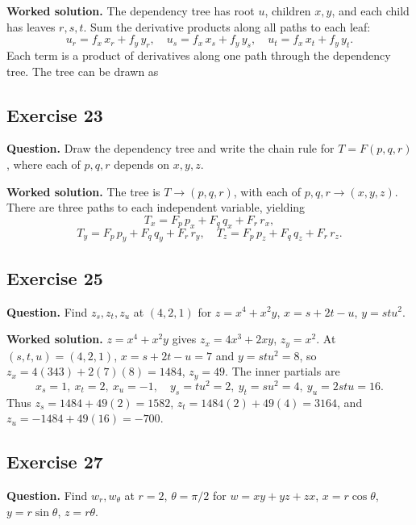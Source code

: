 \documentclass[11pt]{article}
\newcommand{\ex}[1]{\Needspace{8\baselineskip}\subsection*{Exercise #1}}
\newcommand{\ans}[1]{\boxed{#1}}
\begin{document}
\textbf{Worked solution.}
The dependency tree has root $u$, children $x,y$, and each child has leaves $r,s,t$. Sum the derivative products along all paths to each leaf:
\[\ans{u_r=f_x\,x_r+f_y\,y_r},\quad\ans{u_s=f_x\,x_s+f_y\,y_s},\quad\ans{u_t=f_x\,x_t+f_y\,y_t}.\]
Each term is a product of derivatives along one path through the dependency tree. The tree can be drawn as
\begin{center}\end{center}
\ex{23}
\textbf{Question.} Draw the dependency tree and write the chain rule for $T=F(p,q,r)$, where each of $p,q,r$ depends on $x,y,z$.

\textbf{Worked solution.}
The tree is $T\to(p,q,r)$, with each of $p,q,r\to(x,y,z)$. There are three paths to each independent variable, yielding
\[\ans{T_x=F_p\,p_x+F_q\,q_x+F_r\,r_x},\]
\[\ans{T_y=F_p\,p_y+F_q\,q_y+F_r\,r_y},\quad
\ans{T_z=F_p\,p_z+F_q\,q_z+F_r\,r_z}.\]
\begin{center}\end{center}
\ex{25}
\textbf{Question.} Find $z_s,z_t,z_u$ at $(4,2,1)$ for $z=x^4+x^2y$, $x=s+2t-u$, $y=stu^2$.

\textbf{Worked solution.}
$z=x^4+x^2y$ gives $z_x=4x^3+2xy$, $z_y=x^2$. At $(s,t,u)=(4,2,1)$, $x=s+2t-u=7$ and $y=stu^2=8$, so $z_x=4(343)+2(7)(8)=1484$, $z_y=49$. The inner partials are
\[x_s=1,\ x_t=2,\ x_u=-1,\quad y_s=tu^2=2,\ y_t=su^2=4,\ y_u=2stu=16.\]
Thus $\ans{z_s=1484+49(2)=1582}$, $\ans{z_t=1484(2)+49(4)=3164}$, and $\ans{z_u=-1484+49(16)=-700}$.
\ex{27}
\textbf{Question.} Find $w_r,w_\theta$ at $r=2$, $\theta=\pi/2$ for $w=xy+yz+zx$, $x=r\cos\theta$, $y=r\sin\theta$, $z=r\theta$.
\end{document}
